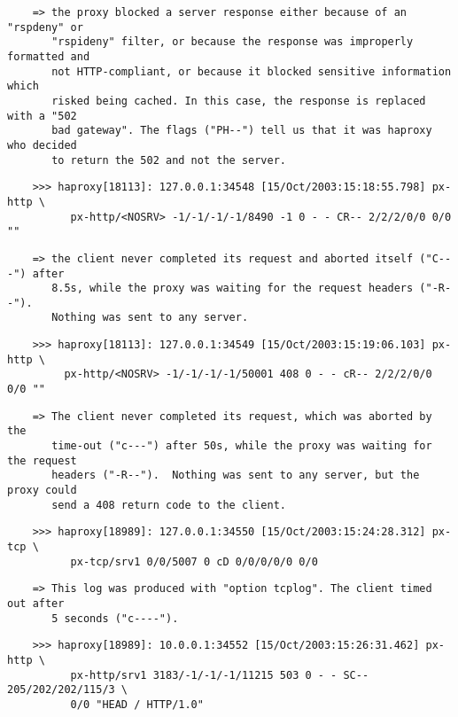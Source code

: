 \begin{verbatim}
    => the proxy blocked a server response either because of an "rspdeny" or
       "rspideny" filter, or because the response was improperly formatted and
       not HTTP-compliant, or because it blocked sensitive information which
       risked being cached. In this case, the response is replaced with a "502
       bad gateway". The flags ("PH--") tell us that it was haproxy who decided
       to return the 502 and not the server.
\end{verbatim}

\begin{verbatim}
    >>> haproxy[18113]: 127.0.0.1:34548 [15/Oct/2003:15:18:55.798] px-http \
          px-http/<NOSRV> -1/-1/-1/-1/8490 -1 0 - - CR-- 2/2/2/0/0 0/0 ""
\end{verbatim}

\begin{verbatim}
    => the client never completed its request and aborted itself ("C---") after
       8.5s, while the proxy was waiting for the request headers ("-R--").
       Nothing was sent to any server.
\end{verbatim}

\begin{verbatim}
    >>> haproxy[18113]: 127.0.0.1:34549 [15/Oct/2003:15:19:06.103] px-http \
         px-http/<NOSRV> -1/-1/-1/-1/50001 408 0 - - cR-- 2/2/2/0/0 0/0 ""
\end{verbatim}

\begin{verbatim}
    => The client never completed its request, which was aborted by the
       time-out ("c---") after 50s, while the proxy was waiting for the request
       headers ("-R--").  Nothing was sent to any server, but the proxy could
       send a 408 return code to the client.
\end{verbatim}

\begin{verbatim}
    >>> haproxy[18989]: 127.0.0.1:34550 [15/Oct/2003:15:24:28.312] px-tcp \
          px-tcp/srv1 0/0/5007 0 cD 0/0/0/0/0 0/0
\end{verbatim}

\begin{verbatim}
    => This log was produced with "option tcplog". The client timed out after
       5 seconds ("c----").
\end{verbatim}

\begin{verbatim}
    >>> haproxy[18989]: 10.0.0.1:34552 [15/Oct/2003:15:26:31.462] px-http \
          px-http/srv1 3183/-1/-1/-1/11215 503 0 - - SC-- 205/202/202/115/3 \
          0/0 "HEAD / HTTP/1.0"
\end{verbatim}

